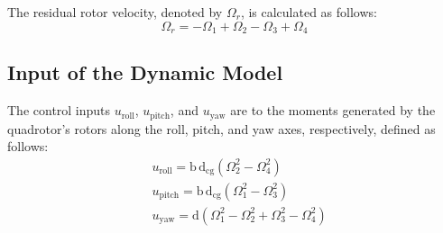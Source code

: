 \documentclass[3p,times]{elsarticle}
\begin{document}
 The residual rotor velocity, denoted by $\Omega_r$, is calculated as follows:
\begin{equation}
	\Omega_r = -\Omega_1 + \Omega_2 - \Omega_3 + \Omega_4
\end{equation}
\subsection{Input of the Dynamic Model}

\noindent The control inputs $u_{\text{roll}}$, $u_{\text{pitch}}$, and $u_{\text{yaw}}$ are to the moments generated by the quadrotor's rotors along the roll, pitch, and yaw axes, respectively, defined as follows:
\begin{align}
		&u_{\text{roll}} = \mathrm{b\,d}_{\text{cg}} (\Omega_2^2 - \Omega_4^2)\\
	&u_{\text{pitch}} = \mathrm{b\,d}_{\text{cg}} (\Omega_1^2 - \Omega_3^2) \\
	&u_{\text{yaw}} = \mathrm{d} (\Omega_1^2 - \Omega_2^2 + \Omega_3^2 - \Omega_4^2)
\end{align}
\end{document}
